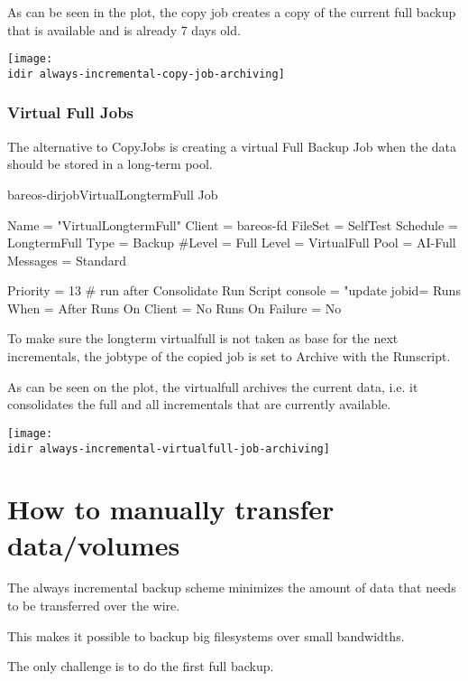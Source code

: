 As can be seen in the plot, the copy job creates a copy of the current full backup that is available and is already 7 days old.
\begin{center}
\texttt{[image: \\idir always-incremental-copy-job-archiving]}
\end{center}


\subsection{Virtual Full Jobs}

The alternative to CopyJobs is creating a virtual Full Backup Job when the data should be stored in a long-term pool.

\begin{bareosConfigResource}{bareos-dir}{job}{VirtualLongtermFull}
Job {
  Name = "VirtualLongtermFull"
  Client = bareos-fd
  FileSet = SelfTest
  Schedule = LongtermFull
  Type = Backup
  #Level = Full
  Level = VirtualFull
  Pool = AI-Full
  Messages = Standard

  Priority = 13                 # run after  Consolidate
  Run Script {
        console = "update jobid=%
        Runs When =  After
   Runs On Client = No
        Runs On Failure = No
  }
}
\end{bareosConfigResource}


To make sure the longterm virtualfull is not taken as base for the next incrementals, the jobtype of the copied job is set to Archive with the Runscript.

As can be seen on the plot, the virtualfull archives the current data, i.e. it consolidates the full and all incrementals that are currently available.

\begin{center}
\texttt{[image: \\idir always-incremental-virtualfull-job-archiving]}
\end{center}


\chapter{How to manually transfer data/volumes}

The always incremental backup scheme minimizes the amount of data that needs 
to be transferred over the wire.

This makes it possible to backup big filesystems over small bandwidths.

The only challenge is to do the first full backup.


